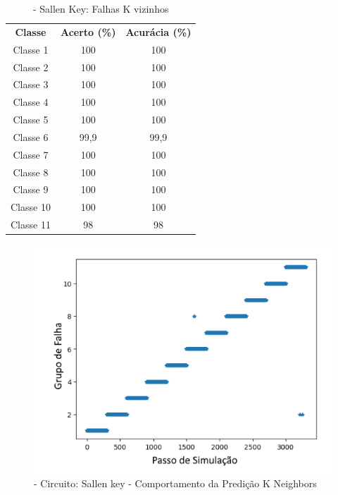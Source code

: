 \begin{itemize}
 \begin{table}[ht]
\centering
\begin{tabular}{ccc}
\textbf{Classe} & \textbf{Acerto (\%)} & \textbf{Acurácia (\%)} \\
Classe 1        & 100                  & 100                    \\
Classe 2        & 100                  & 100                    \\
Classe 3        & 100                  & 100                    \\
Classe 4        & 100                  & 100                    \\
Classe 5        & 100                  & 100                    \\
Classe 6        & 99,9                  & 99,9                    \\
Classe 7        & 100                  & 100                    \\
Classe 8        & 100                  & 100                    \\
Classe 9        & 100                  & 100                    \\
Classe 10       & 100                  & 100                    \\
Classe 11       & 98                  & 98                                 
\end{tabular}
\caption{\label{tab:sallenKvizinhos}- Sallen Key: Falhas K vizinhos}
\end{table}


  \begin{figure}[H]
        \begin{center}
        \includegraphics[width=13cm]{./01_Pre_textuais/sallen_figs/KNeighborsClassifier_Sallen_Key_mc_+_4bitPRBS_[FALHA]raw.png}
        \caption{\label{fig:KNeighborsClassifieSalenkey}- Circuito: Sallen key - Comportamento da Predição K Neighbors }
        \end{center}
        \end{figure}


\end{itemize}
